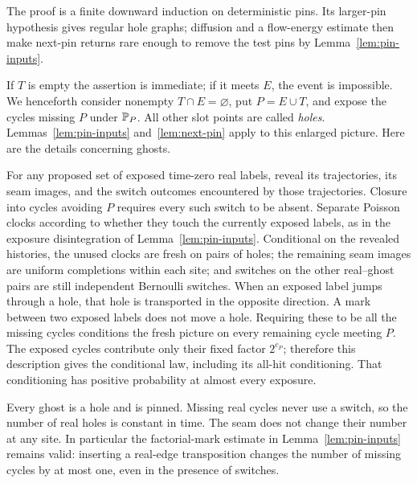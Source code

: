 The proof is a finite downward induction on deterministic pins.
Its larger-pin hypothesis gives regular hole graphs; diffusion and a
flow-energy estimate then make next-pin returns rare enough to remove
the test pins by Lemma~\ref{lem:pin-inputs}.

If \(T\) is empty the assertion is immediate; if it meets \(E\),
the event is impossible.  We henceforth consider nonempty
\(T\cap E=\varnothing\), put \(P=E\cup T\), and expose the cycles
missing \(P\) under \(\mathbb P_P\).  All other slot points are called
\emph{holes}.  Lemmas~\ref{lem:pin-inputs} and~\ref{lem:next-pin}
apply to this enlarged picture.  Here are the details concerning ghosts.

For any proposed set of exposed time-zero real labels, reveal its
trajectories, its seam images, and the switch outcomes encountered by
those trajectories.  Closure into cycles avoiding \(P\) requires every
such switch to be absent.  Separate Poisson clocks according to whether
they touch the currently exposed labels, as in the exposure
disintegration of Lemma~\ref{lem:pin-inputs}.  Conditional on the
revealed histories, the unused clocks are fresh on pairs of holes;
the remaining seam images are uniform completions within each site;
and switches on the other real--ghost pairs are still independent
Bernoulli switches.  When an exposed label jumps through a hole, that
hole is transported in the opposite direction.  A mark between two
exposed labels does not move a hole.  Requiring these to be all the
missing cycles conditions the fresh picture on every remaining cycle
meeting \(P\).  The exposed cycles contribute only their fixed factor
\(2^{c_P}\); therefore this description gives the conditional law,
including its all-hit conditioning.  That conditioning has positive
probability at almost every exposure.

Every ghost is a hole and is pinned.  Missing real cycles never use a
switch, so the number of real holes is constant in time.  The seam
does not change their number at any site.  In particular the
factorial-mark estimate in Lemma~\ref{lem:pin-inputs} remains valid:
inserting a real-edge transposition changes the number of missing
cycles by at most one, even in the presence of switches.

